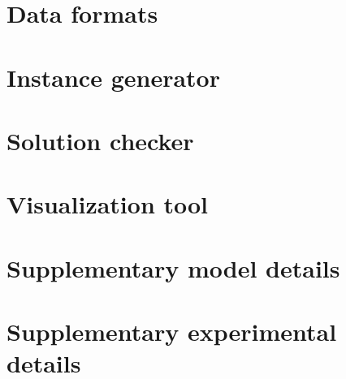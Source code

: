\chapter{Data formats}\label{app:data-formats}

\chapter{Instance generator}\label{app:instance-generator}

\chapter{Solution checker}\label{app:solution-checker}

\chapter{Visualization tool}\label{app:visualization-tool}

\chapter{Supplementary model details}\label{app:model-details}

\chapter{Supplementary experimental details}\label{app:experimental-details}

